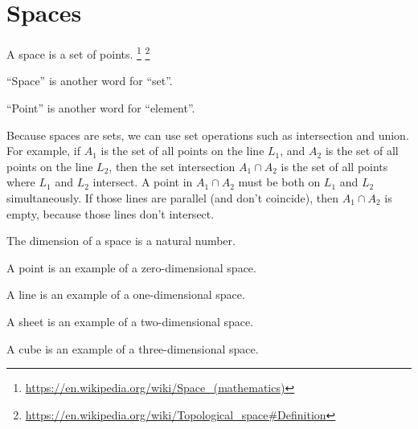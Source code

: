 \chapter{Spaces}
\label{chp:manifold}

A space is a set of points.%
\footnote{\url{https://en.wikipedia.org/wiki/Space_(mathematics)}}%
\footnote{\url{https://en.wikipedia.org/wiki/Topological_space\#Definition}}

\enquote{Space} is another word for \enquote{set}.

\enquote{Point} is another word for \enquote{element}.

Because spaces are sets,
we can use set operations such as intersection and union.
For example, if \(A_1\) is the set of all points on the line \(L_1\),
and \(A_2\) is the set of all points on the line \(L_2\),
then the set intersection \(A_1 \cap A_2\)
is the set of all points where \(L_1\) and \(L_2\) intersect.
A point in \(A_1 \cap A_2\) must be both on \(L_1\) and \(L_2\) simultaneously.
If those lines are parallel (and don't coincide),
then \(A_1 \cap A_2\) is empty,
because those lines don't intersect.

The dimension of a space is a natural number.

A point is an example of a zero-dimensional space.

A line is an example of a one-dimensional space.

A sheet is an example of a two-dimensional space.

A cube is an example of a three-dimensional space.
